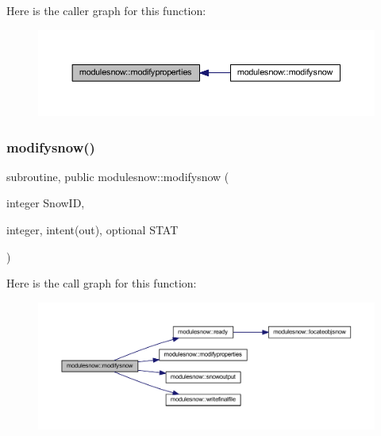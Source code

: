 Here is the caller graph for this function\+:\nopagebreak
\begin{figure}[H]
\begin{center}
\leavevmode
\includegraphics[width=350pt]{namespacemodulesnow_aada914398244e3d136722b4c1c7a5abf_icgraph}
\end{center}
\end{figure}
\mbox{\label{namespacemodulesnow_a4bf35b96ab1a5b04412fedf95560ec5b}} 
\subsubsection{\texorpdfstring{modifysnow()}{modifysnow()}}
{\footnotesize\ttfamily subroutine, public modulesnow\+::modifysnow (\begin{DoxyParamCaption}\item[{integer}]{Snow\+ID,  }\item[{integer, intent(out), optional}]{S\+T\+AT }\end{DoxyParamCaption})}

Here is the call graph for this function\+:\nopagebreak
\begin{figure}[H]
\begin{center}
\leavevmode
\includegraphics[width=350pt]{namespacemodulesnow_a4bf35b96ab1a5b04412fedf95560ec5b_cgraph}
\end{center}
\end{figure}
\mbox{\label{namespacemodulesnow_a65a805e3fa668273a96e5a6c2f76644d}} 
